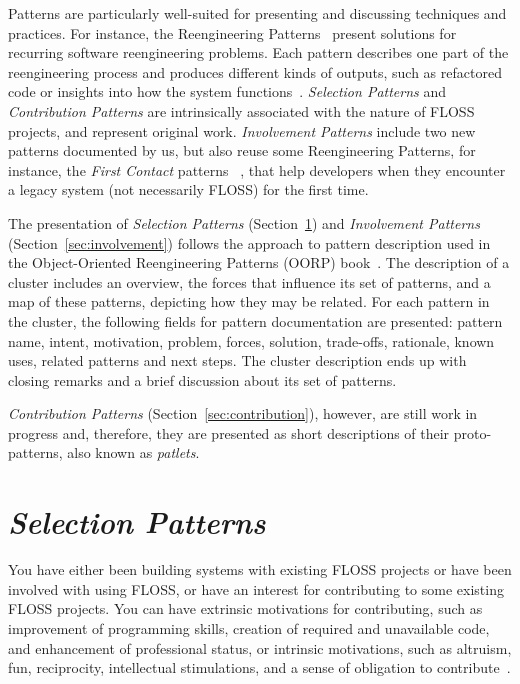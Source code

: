 \documentclass[12pt]{article}
\begin{document}
Patterns are particularly well-suited for presenting and discussing
techniques and practices. 
For instance, the Reengineering Patterns~\cite{demeyer2008}  present solutions 
for  recurring software reengineering problems. 
Each pattern describes one part of
the reengineering process and produces different kinds of outputs, such as 
refactored code or insights into how the system functions~\cite{demeyer2008}.
\textit{Selection Patterns} and \textit{Contribution Patterns} are
intrinsically associated with the nature of FLOSS projects, 
and represent original work. 
\textit{Involvement Patterns} include two new patterns documented by us,
but also reuse some  Reengineering Patterns,
for instance, the \textit{ First Contact} patterns ~\cite[p.~39]{demeyer2008},
that help developers when they encounter a legacy system
(not necessarily FLOSS) for the first time.


The presentation of \textit{Selection Patterns} (Section~\ref{sec:selection}) and
\textit{Involvement Patterns} (Section~\ref{sec:involvement})
follows the approach to pattern description used in the 
Object-Oriented Reengineering Patterns (OORP) book~\cite{demeyer2008}.
The description of a cluster includes an overview, 
the forces that influence its set of patterns,
and a map of these patterns, depicting how they may be related.  
For each pattern in the cluster, the following fields for pattern documentation
are presented: 
pattern name, intent, motivation, problem, forces, solution, trade-offs, rationale,
known uses, related patterns and next steps. 
The cluster description ends up with closing remarks and a brief discussion
about its set of patterns. 

\textit{Contribution Patterns} (Section~\ref {sec:contribution}), however,
are still work in progress and, therefore, they are presented 
as short descriptions of their proto-patterns, 
also known as \textit{patlets}.

\section{\textit{Selection Patterns}} \label{sec:selection}

You have either been building systems with existing FLOSS projects or 
have been involved with using FLOSS, or 
have an interest for contributing to some existing FLOSS projects.
%
You can have extrinsic motivations for contributing, 
such as improvement of programming skills, 
creation of required and unavailable code, 
and enhancement of professional status,
or intrinsic motivations, such as altruism, fun, reciprocity, 
intellectual stimulations, and a sense of obligation to contribute~\cite[p.~2058]{oreg2008}.
\end{document}
